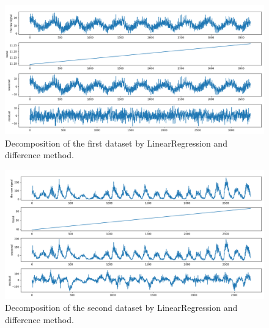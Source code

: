 \begin{figure}[H]
    \centering
    \begin{minipage}[b]{1\textwidth}
        \includegraphics[width=\textwidth]{figures/Ass1/Ass1_D1_LinearRegression_diff.png}
    \end{minipage}
    \caption{Decomposition of the first dataset by LinearRegression and difference method.}
    \label{fig:Ass1_D1_LinearRegression_diff}
\end{figure}

\begin{figure}[H]
    \centering
    \begin{minipage}[b]{1\textwidth}
        \includegraphics[width=\textwidth]{figures/Ass1/Ass1_D2_LinearRegression_diff.png}
    \end{minipage}
    \caption{Decomposition of the second dataset by LinearRegression and difference method.}
    \label{fig:Ass1_D2_LinearRegression_diff}
\end{figure}

